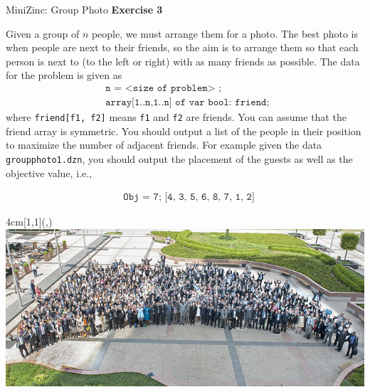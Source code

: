\begin{frame}{MiniZinc: Group Photo}
\textbf{Exercise 3}

Given a group of $n$ people, we must arrange them for a photo. The best
photo is when people are next to their friends, so the aim is to arrange them so that each person
is next to (to the left or right) with as many friends as possible. The data for the
problem is given as
%
\begin{align*}
& \texttt{n = <size of problem> ;} \\
& \texttt{array[1..n,1..n] of var bool: friend; }
\end{align*} 
%
where \texttt{friend[f1, f2]} means \texttt{f1} and \texttt{f2} are friends. You can assume that the friend array is symmetric.
You should output a list of the people in their position to maximize the number of adjacent
friends. For example given the data \texttt{groupphoto1.dzn}, you should output the placement of the guests as well as the objective value, i.e.,

\begin{align*}
& \texttt{Obj = 7; [4, 3, 5, 6, 8, 7, 1, 2]}
\end{align*}


\begin{textblock*}{4cm}[1,1](\textwidth,\textheight-0.33cm)
\includegraphics[width=\textwidth]{img/group-photo.jpg}
\end{textblock*}

\end{frame}
